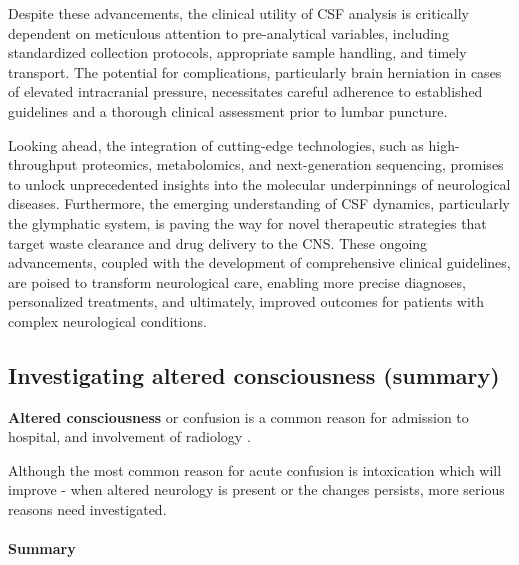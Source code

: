 	Despite these advancements, the clinical utility of CSF analysis is critically dependent on meticulous attention to pre-analytical variables, including standardized collection protocols, appropriate sample handling, and timely transport. The potential for complications, particularly brain herniation in cases of elevated intracranial pressure, necessitates careful adherence to established guidelines and a thorough clinical assessment prior to lumbar puncture.
	
	Looking ahead, the integration of cutting-edge technologies, such as high-throughput proteomics, metabolomics, and next-generation sequencing, promises to unlock unprecedented insights into the molecular underpinnings of neurological diseases. Furthermore, the emerging understanding of CSF dynamics, particularly the glymphatic system, is paving the way for novel therapeutic strategies that target waste clearance and drug delivery to the CNS. These ongoing advancements, coupled with the development of comprehensive clinical guidelines, are poised to transform neurological care, enabling more precise diagnoses, personalized treatments, and ultimately, improved outcomes for patients with complex neurological conditions.


\subsection{Investigating altered consciousness (summary)}

\textbf{Altered consciousness} or confusion is a common reason for admission to hospital, and involvement of radiology .

Although the most common reason for acute confusion is intoxication which will improve - when altered neurology is present or the changes persists, more serious reasons need investigated.

\paragraph{Summary}

